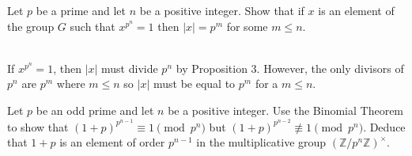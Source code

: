 \begin{exercise}
    Let $p$ be a prime and let $n$ be a positive integer. Show that if $x$ is an element of the group $G$ such that $x^{p^n}=1$ then $|x|=p^m$ for some $m\leq n$.\\
\end{exercise}

\begin{solution}
    \\ If $x^{p^n}=1$, then $|x|$ must divide $p^n$ by Proposition $3$. However, the only divisors of $p^n$ are $p^m$ where $m\leq n$ so $|x|$ must be equal to $p^m$ for a $m\leq n$.\\
\end{solution}

\begin{exercise}
    Let $p$ be an odd prime and let $n$ be a positive integer. Use the Binomial Theorem to show that $(1+p)^{p^{n-1}}\equiv 1 \pmod{p^n}$ but $(1+p)^{p^{n-2}}\not\equiv 1 \pmod{p^n}$. Deduce that $1+p$ is an element of order $p^{n-1}$ in the multiplicative group $(\mathbb{Z}/p^n\mathbb{Z})^{\times}$.\\
\end{exercise}

